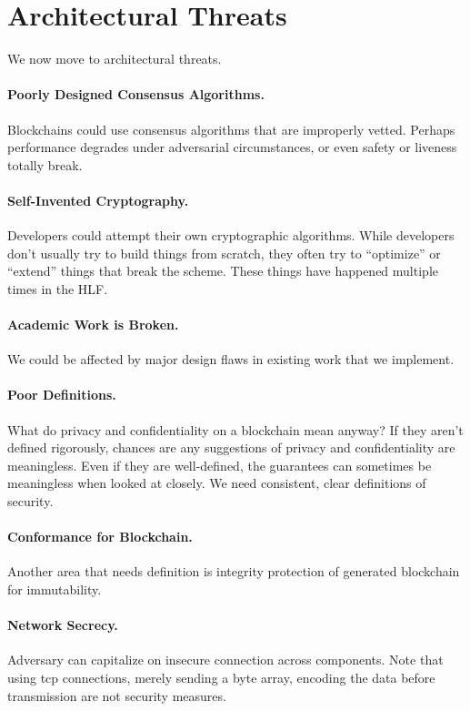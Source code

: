 
\section{Architectural Threats}
We now move to architectural threats.

\paragraph{Poorly Designed Consensus Algorithms.}  Blockchains could use consensus algorithms that are improperly vetted.  Perhaps performance degrades under adversarial circumstances, or even safety or liveness totally break.

\paragraph{Self-Invented Cryptography.}  Developers could attempt their own cryptographic algorithms.  While developers don't usually try to build things from scratch, they often try to ``optimize'' or ``extend'' things that break the scheme.  These things have happened multiple times in the HLF.

\paragraph{Academic Work is Broken.}  We could be affected by major design flaws in existing work that we implement.  

\paragraph{Poor Definitions.}  What do privacy and confidentiality on a blockchain mean anyway?  If they aren't defined rigorously, chances are any suggestions of privacy and confidentiality are meaningless.  Even if they are well-defined, the guarantees can sometimes be meaningless when looked at closely.  We need consistent, clear definitions of security.

\paragraph{Conformance for Blockchain.}  Another area that needs definition is integrity protection of generated blockchain for immutability.

\paragraph{Network Secrecy.}  Adversary can capitalize on insecure connection across components. Note that using tcp connections, merely sending a byte array, encoding the data before transmission are not security measures.

